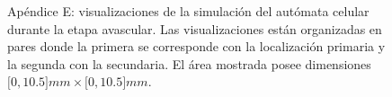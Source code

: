 \begin{appendixes}
\begin{figure}[!ht]
\begin{center}
    \end{center}\vspace*{-0.75cm}
    \caption[Ap\'endice E: visualizaciones de la simulaci\'on del aut\'omata celular durante la etapa avascular]{Ap\'endice E: visualizaciones de la simulaci\'on del aut\'omata celular durante la etapa avascular. Las visualizaciones est\'an organizadas en pares donde la primera se corresponde con la localizaci\'on primaria y la segunda con la secundaria. El \'area mostrada posee dimensiones $[0,10$.$5]mm \times [0,10$.$5]mm$.}
    \end{figure}
    

\end{appendixes}
